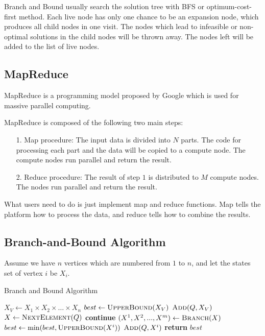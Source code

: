 Branch and Bound usually search the solution tree with BFS or optimum-cost-first method. Each live node has only one chance to be an expansion node, which produces all child nodes in one visit. The nodes which lead to infeasible or non-optimal solutions in the child nodes will be thrown away. The nodes left will be added to the list of live nodes.

\subsection{MapReduce}
MapReduce is a programming model proposed by Google which is used for massive parallel computing.

MapReduce is composed of the following two main steps:
\begin{itemize}
\item[1.]	Map procedure: The input data is divided into $N$ parts. The code for processing each part and the data will be copied to a compute node. The compute nodes run parallel and return the result.
\item[2.]	Reduce procedure: The result of step $1$ is distributed to $M$ compute nodes. The nodes run parallel and return the result.
\end{itemize}

What users need to do is just implement map and reduce functions. Map tells the platform how to process the data, and reduce tells how to combine the results.

\subsection{Branch-and-Bound Algorithm}
Assume we have $n$ vertices which are numbered from $1$ to $n$, and let the states set of vertex $i$ be $X_i$.
\begin{algorithm}[h]
\caption{Branch and Bound Algorithm}
\begin{algorithmic}[1]
    \State $X_V \gets X_1\times X_2\times\dots\times X_n$
    \State $best \gets \textsc{UpperBound}(X_V)$
    \State $\textsc{Add}(Q,X_V)$
        \State $X \gets \textsc{NextElement}(Q)$
            \State \textbf{continue}
        \EndIf
        \State $(X^1,X^2,...,X^m) \gets \textsc{Branch}(X)$
            \State $best \gets \min(best, \textsc{UpperBound}(X^i))$
        \EndFor
                \State $\textsc{Add}(Q,X^i)$
            \EndIf
        \EndFor
    \EndWhile
    \State \textbf{return }$best$
\EndFunction
\end{algorithmic}
\end{algorithm}

